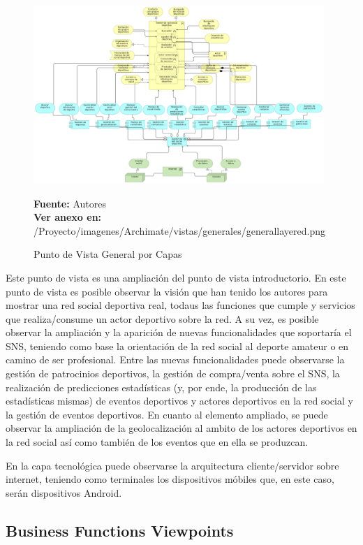 \begin{figure}[!htb]
  \begin{center}
    \includegraphics[width=11cm]{./imagenes/Archimate/vistas/generales/generallayered.png}
    \caption{Punto de Vista General por Capas}
    \label{fig:general_layered}
    \textbf{Fuente:}  Autores \\
    \textbf{Ver anexo en:} /Proyecto/imagenes/Archimate/vistas/generales/generallayered.png
  \end{center}
\end{figure}

Este punto de vista es una ampliación del punto de vista introductorio. En este punto de vista es posible observar la visión que han tenido los autores para mostrar una red social deportiva real, todaus las funciones que cumple y servicios que realiza/consume un actor deportivo sobre la red. A su vez, es posible observar la ampliación y la aparición de nuevas funcionalidades que soportaría el SNS, teniendo como base la orientación de la red social al deporte amateur o en camino de ser profesional. Entre las nuevas funcionalidades puede observarse la gestión de patrocinios deportivos, la gestión de compra/venta sobre el SNS, la realización de predicciones estadísticas (y, por ende, la producción de las estadísticas mismas) de eventos deportivos y actores deportivos en la red social y la gestión de eventos deportivos. En cuanto al elemento ampliado, se puede observar la ampliación de la geolocalización al ambito de los actores deportivos en la red social así como también de los eventos que en ella se produzcan.

En la capa tecnológica puede observarse la arquitectura cliente/servidor sobre internet, teniendo como terminales los dispositivos móbiles que, en este caso, serán dispositivos Android.

\subsection{Business Functions Viewpoints}

